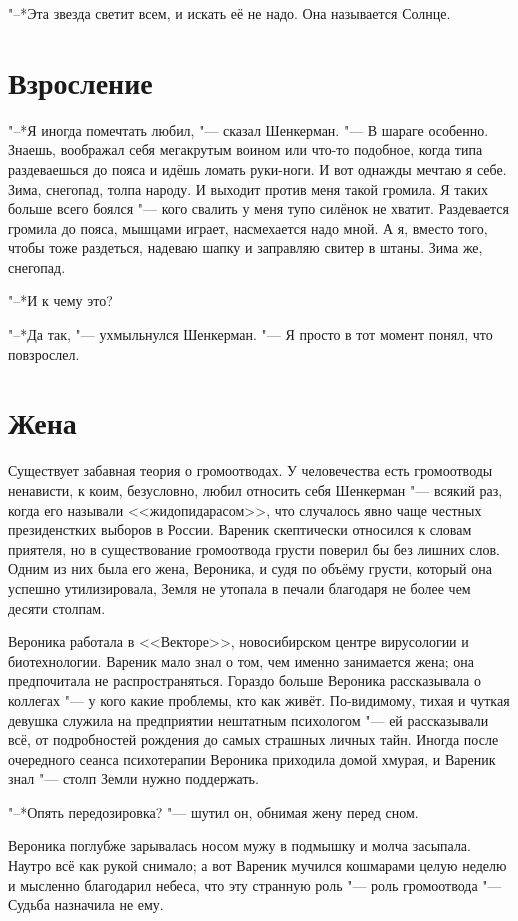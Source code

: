 "--*Эта звезда светит всем, и искать её не надо.
Она называется Солнце.

\section{Взросление}

"--*Я иногда помечтать любил, "--- сказал Шенкерман.
"--- В шараге особенно. 
Знаешь, воображал себя мегакрутым воином или что-то подобное, когда типа раздеваешься до пояса и идёшь ломать руки-ноги.
И вот однажды мечтаю я себе.
Зима, снегопад, толпа народу.
И выходит против меня такой громила.
Я таких больше всего боялся "--- кого свалить у меня тупо силёнок не хватит.
Раздевается громила до пояса, мышцами играет, насмехается надо мной.
А я, вместо того, чтобы тоже раздеться, надеваю шапку и заправляю свитер в штаны.
Зима же, снегопад.

"--*И к чему это?

"--*Да так, "--- ухмыльнулся Шенкерман.
"--- Я просто в тот момент понял, что повзрослел.

\section{Жена}

Существует забавная теория о громоотводах.
У человечества есть громоотводы ненависти, к коим, безусловно, любил относить себя Шенкерман "--- всякий раз, когда его называли <<жидопидарасом>>, что случалось явно чаще честных президенстких выборов в России.
Вареник скептически относился к словам приятеля, но в существование громоотвода грусти поверил бы без лишних слов.
Одним из них была его жена, Вероника, и судя по объёму грусти, который она успешно утилизировала, Земля не утопала в печали благодаря не более чем десяти столпам.

Вероника работала в <<Векторе>>, новосибирском центре вирусологии и биотехнологии.
Вареник мало знал о том, чем именно занимается жена;
она предпочитала не распространяться.
Гораздо больше Вероника рассказывала о коллегах "--- у кого какие проблемы, кто как живёт.
По-видимому, тихая и чуткая девушка служила на предприятии нештатным психологом "--- ей рассказывали всё, от подробностей рождения до самых страшных личных тайн.
Иногда после очередного сеанса психотерапии Вероника приходила домой хмурая, и Вареник знал "--- столп Земли нужно поддержать.

"--*Опять передозировка? "--- шутил он, обнимая жену перед сном.

Вероника поглубже зарывалась носом мужу в подмышку и молча засыпала.
Наутро всё как рукой снимало;
а вот Вареник мучился кошмарами целую неделю и мысленно благодарил небеса, что эту странную роль "--- роль громоотвода "--- Судьба назначила не ему.

